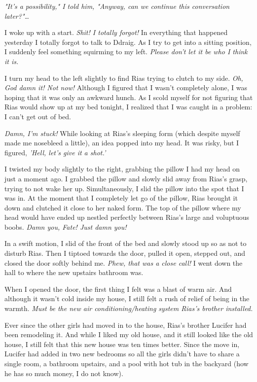 \documentclass{article}
\begin{document}
\emph{"It's a possibility," I told him, "Anyway, can we continue this conversation later?"…}

I woke up with a start. \emph{Shit! I totally forgot!} In everything that happened yesterday I totally forgot to talk to Ddraig. As I try to get into a sitting position, I suddenly feel something squirming to my left. \emph{Please don't let it be who I think it is.}

I turn my head to the left slightly to find Rias trying to clutch to my side. \emph{Oh, God damn it! Not now!} Although I figured that I wasn't completely alone, I was hoping that it was only an awkward hunch. As I scold myself for not figuring that Rias would show up at my bed tonight, I realized that I was caught in a problem: I can't get out of bed.

\emph{Damn, I'm stuck!} While looking at Rias's sleeping form (which despite myself made me nosebleed a little), an idea popped into my head. It was risky, but I figured, \emph{'Hell, let's give it a shot.'}

I twisted my body slightly to the right, grabbing the pillow I had my head on just a moment ago. I grabbed the pillow and slowly slid away from Rias's grasp, trying to not wake her up. Simultaneously, I slid the pillow into the spot that I was in. At the moment that I completely let go of the pillow, Rias brought it down and clutched it close to her naked form. The top of the pillow where my head would have ended up nestled perfectly between Rias's large and voluptuous boobs. \emph{Damn you, Fate! Just damn you!}

In a swift motion, I slid of the front of the bed and slowly stood up so as not to disturb Rias. Then I tiptoed towards the door, pulled it open, stepped out, and closed the door softly behind me. \emph{Phew, that was a close call!} I went down the hall to where the new upstairs bathroom was.

When I opened the door, the first thing I felt was a blast of warm air. And although it wasn't cold inside my house, I still felt a rush of relief of being in the warmth. \emph{Must be the new air conditioning/heating system Rias's brother installed.} 

Ever since the other girls had moved in to the house, Rias's brother Lucifer had been remodeling it. And while I liked my old house, and it still looked like the old house, I still felt that this new house was ten times better. Since the move in, Lucifer had added in two new bedrooms so all the girls didn't have to share a single room, a bathroom upstairs, and a pool with hot tub in the backyard (how he has so much money, I do not know).
\end{document}
